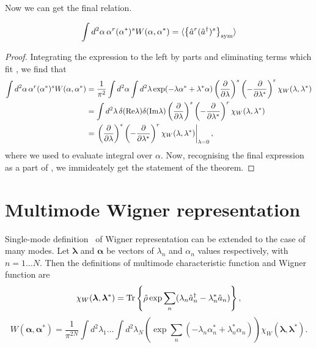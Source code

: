 Now we can get the final relation.
\begin{theorem}
\label{thm:multimode-formalism:single-mode-wigner-moments}
\[
	\int d^2\alpha\, \alpha^r (\alpha^*)^s W(\alpha, \alpha^*)
	= \langle \left\{  \hat{a}^r (\hat{a}^\dagger)^s  \right\}_{\mathrm{sym}} \rangle
\]
\end{theorem}
\begin{proof}
Integrating the expression to the left by parts and eliminating terms which fit , we find that
\begin{equation*}
\begin{split}
	\int d^2\alpha\, \alpha^r (\alpha^*)^s W(\alpha, \alpha^*)
	& = \frac{1}{\pi^2} \int d^2\alpha \int d^2\lambda
		\exp(-\lambda \alpha^* + \lambda^* \alpha)
		\left( \frac{\partial}{\partial \lambda} \right)^s
		\left( -\frac{\partial}{\partial \lambda^*} \right)^r
		\chi_W (\lambda, \lambda^*) \\
	& = \int d^2\lambda\,
		\delta (\mathrm{Re} \lambda) \delta (\mathrm{Im} \lambda)
		\left( \frac{\partial}{\partial \lambda} \right)^s
		\left( -\frac{\partial}{\partial \lambda^*} \right)^r
		\chi_W (\lambda, \lambda^*) \\
	& = \left.
		\left( \frac{\partial}{\partial \lambda} \right)^s
		\left( -\frac{\partial}{\partial \lambda^*} \right)^r
		\chi_W (\lambda, \lambda^*)
	\right|_{\lambda=0},
\end{split}
\end{equation*}
where we used  to evaluate integral over $\alpha$.
Now, recognising the final expression as a part of ,
we immideately get the statement of the theorem.
\end{proof}

\section{Multimode Wigner representation}

Single-mode definition~ of Wigner representation can be extended to the case of many modes.
Let $\bm{\lambda}$ and $\bm{\alpha}$ be vectors of $\lambda_n$ and $\alpha_n$ values respectively,
with $n = 1 \ldots N$.
Then the definitions of multimode characteristic function and Wigner function are
\[
	\chi_W (\bm{\lambda}, \bm{\lambda}^*)
	= \mathrm{Tr} \left\{  \hat{\rho} \exp \sum\limits_n
		(\lambda_n \hat{a}_n^\dagger - \lambda_n^* \hat{a}_n)  \right\},
\]
\begin{equation}
\label{eqn:multimode-formalism:multimode-wigner}
	W (\bm{\alpha}, \bm{\alpha}^*)
	= \frac{1}{\pi^{2N}} \int d^2 \lambda_1 \ldots \int d^2 \lambda_N
		\left(
			\exp \sum\limits_n (-\lambda_n \alpha_n^* + \lambda_n^* \alpha_n)
		\right)
		\chi_W (\bm{\lambda}, \bm{\lambda}^*).
\end{equation}

